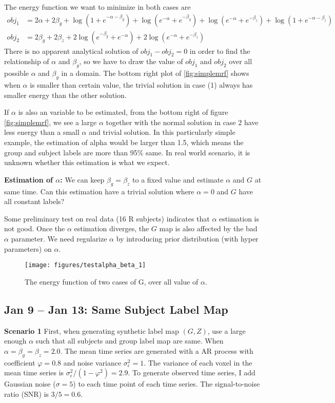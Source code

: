 \documentclass{article}
\begin{document}
The energy function we want to minimize in both cases are
\begin{align*}
obj_1 &= 2\alpha + 2\beta_g + \log (1 + e^{-\alpha - \beta_g}) + \log (e^{-\alpha} + e^{-\beta_g}) + \log (e^{-\alpha} + e^{-\beta_z} ) + \log (1 + e^{-\alpha - \beta_z})\\
obj_2 &= 2\beta_g + 2\beta_z + 2 \log (e^{-\beta_g} + e^{-\alpha}) + 2 \log (e^{-\alpha} + e^{-\beta_z})
\end{align*}
There is no apparent analytical solution of $obj_1 - obj_2 = 0$ in order to find the relationship of $\alpha$ and $\beta_g$, so we have to draw the value of $obj_1$ and $obj_2$ over all possible $\alpha$ and $\beta_g$ in a domain. The bottom right plot of \ref{fig:simplemrf} shows when $\alpha$ is smaller than certain value, the trivial solution in case (1) always has smaller energy than the other solution.

If $\alpha$ is also an variable to be estimated, from the bottom right of figure \ref{fig:simplemrf}, we see a large $\alpha$ together with the normal solution in case 2 have less energy than a small $\alpha$ and trivial solution. In this particularly simple example, the estimation of alpha would be larger than 1.5, which means the group and subject labels are more than 95\% same. In real world scenario, it is unknown whether this estimation is what we expect.

\textbf{Estimation of $\alpha$:} We can keep $\beta_g = \beta_z$ to a fixed value and estimate $\alpha$ and $G$ at same time. Can this estimation have a trivial solution where $\alpha = 0$ and $G$ have all constant labels?

Some preliminary test on real data (16 R subjects) indicates that  $\alpha$ estimation is not good. Once the $\alpha$ estimation diverges, the $G$ map is also affected by the bad $\alpha$ parameter. We need regularize  $\alpha$ by introducing prior distribution (with hyper parameters) on $\alpha$.


\begin{figure}[htb]
\centering
\texttt{[image: figures/testalpha\_beta\_1]}
\caption{The energy function of two cases of G,  over all value of $\alpha$. }
\end{figure}

\subsection{Jan 9 -- Jan 13: Same Subject Label Map}
\textbf{Scenario 1} First, when generating synthetic label map $(G, Z)$, use a large enough $\alpha$ such that all subjects and group label map are same. When $\alpha = \beta_g = \beta_z = 2.0$. The mean time series are generated with a AR process with coefficient $\varphi = 0.8$ and noise variance $\sigma_{\epsilon}^2 = 1$. The variance of each voxel in the mean time series is $\sigma_{\epsilon}^2 / (1- \varphi^2) = 2.9$. To generate observed time series, I add Gaussian noise ($\sigma = 5$) to each time point of each time series. The signal-to-noise ratio (SNR) is $3/5 = 0.6$. 
\end{document}
